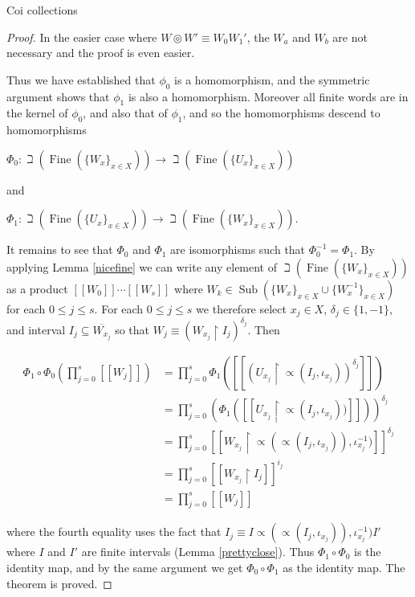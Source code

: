 \documentclass{amsart}
\theoremstyle{definition}\newtheorem{theorem}{Theorem}
\theoremstyle{definition}\newtheorem*{A}{Main Theorem}
\theoremstyle{definition}\newtheorem*{B}{Theorem \ref{elementaryequiv}}
\theoremstyle{definition}\newtheorem*{C}{Theorem \ref{continuous}}
\theoremstyle{definition}\newtheorem*{D}{Theorem \ref{bigisomorphism2}}
\theoremstyle{definition}\newtheorem{bigtheorem}{Main Theorem}
\numberwithin{theorem}{section}
\theoremstyle{definition}\newtheorem{corollary}[theorem]{Corollary}
\theoremstyle{definition}\newtheorem{proposition}[theorem]{Proposition}
\theoremstyle{definition}\newtheorem{definition}[theorem]{Definition}
\theoremstyle{definition}\newtheorem{question}[theorem]{Question}
\theoremstyle{definition}\newtheorem{example}[theorem]{Example}
\theoremstyle{definition}\newtheorem{remark}[theorem]{Remark}
\theoremstyle{definition}\newtheorem{note}[theorem]{Note}
\theoremstyle{definition}\newtheorem{lemma}[theorem]{Lemma}
\theoremstyle{definition}\newtheorem{fact}[theorem]{Fact}
\theoremstyle{definition}\newtheorem{define}[theorem]{Definition}
\theoremstyle{definition}\newtheorem{claim}[theorem]{Claim}
\theoremstyle{definition}\newtheorem{obs}[theorem]{Observation}
\theoremstyle{definition}\newtheorem{definitions}[theorem]{Definitions}
\newcommand{\Sub}{\operatorname{Sub}}
\newcommand{\Fine}{\operatorname{Fine}}
\begin{document}
\begin{section}{Coi collections}
\begin{proof}
\noindent In the easier case where $W \circledcirc W' \equiv W_0W_1'$, the $W_a$ and $W_b$ are not necessary and the proof is even easier.

Thus we have established that $\phi_0$ is a homomorphism, and the symmetric argument shows that $\phi_1$ is also a homomorphism.  Moreover all finite words are in the kernel of $\phi_0$, and also that of $\phi_1$, and so the homomorphisms descend to homomorphisms 

\begin{center}
$\Phi_0: \beth(\Fine(\{W_x\}_{x \in X})) \rightarrow \beth(\Fine(\{U_x\}_{x \in X}))$
\end{center}

\noindent and

\begin{center}
$\Phi_1:  \beth(\Fine(\{U_x\}_{x \in X})) \rightarrow \beth(\Fine(\{W_x\}_{x \in X}))$.
\end{center}

It remains to see that $\Phi_0$ and $\Phi_1$ are isomorphisms such that $\Phi_0^{-1} = \Phi_1$.  By applying Lemma \ref{nicefine} we can write any element of $\beth(\Fine(\{W_x\}_{x \in X}))$ as a product $[[W_0]]\cdots[[W_s]]$ where $W_k \in \Sub(\{W_x\}_{x\in X} \cup \{W_x^{-1}\}_{x \in X})$ for each $0 \leq j \leq s$.  For each $0 \leq j \leq s$ we therefore select $x_j \in X$, $\delta_j \in \{1, -1\}$, and interval $I_j \subseteq \overline{W_{x_j}}$ so that $W_j \equiv (W_{x_j} \upharpoonright I_j)^{\delta_j}$.  Then

$$
\begin{array}{ll}
\Phi_1 \circ \Phi_0(\prod_{j = 0}^s[[W_j]]) & = \prod_{j = 0}^s\Phi_1([[(U_{x_j}\upharpoonright \varpropto (I_j, \iota_{x_j}))^{\delta_j}]])\\
& = \prod_{j = 0}^s (\Phi_1([[U_{x_j}\upharpoonright \varpropto (I_j, \iota_{x_j}))]]))^{\delta_j}\\
& = \prod_{j = 0}^s[[W_{x_j}\upharpoonright \varpropto(\varpropto (I_j, \iota_{x_j})), \iota_{x_j}^{-1})]]^{\delta_j}\\
& = \prod_{j = 0}^s[[W_{x_j}\upharpoonright I_j]]^{i_j}\\
& = \prod_{j = 0}^s[[W_j]]
\end{array}
$$

\noindent where the fourth equality uses the fact that $I_j \equiv I\varpropto(\varpropto (I_j, \iota_{x_j})), \iota_{x_j}^{-1})I'$ where $I$ and $I'$ are finite intervals (Lemma \ref{prettyclose}).  Thus $\Phi_1 \circ \Phi_0$ is the identity map, and by the same argument we get $\Phi_0 \circ \Phi_1$ as the identity map.  The theorem is proved.
\end{proof}


\end{section}
\end{document}
